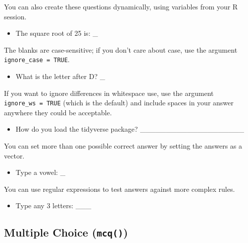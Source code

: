 \documentclass[
  letterpaper,
  DIV=11,
  numbers=noendperiod]{scrreprt}
\providecommand{\tightlist}{%
  \setlength{\itemsep}{0pt}\setlength{\parskip}{0pt}}\usepackage{longtable,booktabs,array}
\begin{document}
You can also create these questions dynamically, using variables from
your R session.

\begin{itemize}
\tightlist
\item
  The square root of 25 is: \_
\end{itemize}

The blanks are case-sensitive; if you don't care about case, use the
argument \texttt{ignore\_case\ =\ TRUE}.

\begin{itemize}
\tightlist
\item
  What is the letter after D? \_
\end{itemize}

If you want to ignore differences in whitespace use, use the argument
\texttt{ignore\_ws\ =\ TRUE} (which is the default) and include spaces
in your answer anywhere they could be acceptable.

\begin{itemize}
\tightlist
\item
  How do you load the tidyverse package?
  \_\_\_\_\_\_\_\_\_\_\_\_\_\_\_\_\_\_\_\_
\end{itemize}

You can set more than one possible correct answer by setting the answers
as a vector.

\begin{itemize}
\tightlist
\item
  Type a vowel: \_
\end{itemize}

You can use regular expressions to test answers against more complex
rules.

\begin{itemize}
\tightlist
\item
  Type any 3 letters: \_\_\_
\end{itemize}

\subsection{\texorpdfstring{Multiple Choice
(\texttt{mcq()})}{Multiple Choice (mcq())}}\label{multiple-choice-mcq}
\end{document}
